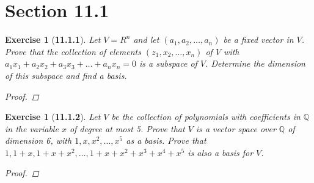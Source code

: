 \documentclass[12pt]{amsart}
\newtheorem{exercise}[theorem]{Exercise}
\theoremstyle{remark}
\newcommand{\QQ}{{\mathbb Q}}
\theoremstyle{mycomment}
\begin{document}
\section*{Section 11.1}

\begin{exercise}[\textbf{11.1.1}] Let $V = R^n$ and let $(a_1, a_2, \dots, a_n)$ be a fixed vector in $V$. Prove that the collection of elements
  $(z_1, x_2, \dots, x_n)$ of $V$ with $a_1x_1 + a_2x_2 + a_3x_3 + \dots + a_nx_n = 0$ is a subspace of $V$. Determine the dimension of this subspace 
  and find a basis.  
  \begin{proof} 
    
  \end{proof}
\end{exercise}
\vspace{.5in}



\begin{exercise}[\textbf{11.1.2}] Let $V$ be the collection of polynomials with coefficients in $\QQ$ in the variable $x$ of degree
  at most 5. Prove that $V$ is a vector space over $\QQ$ of dimension 6, with $1,x,x^2, \dots, x^5$ as a basis. Prove that $1, 1 + x, 1 + x + x^2, \dots, 1 + x + x^2 + x^3 + x^4 + x^5$ is 
  also a basis for $V$.
  \begin{proof}
    
  \end{proof}
\end{exercise}
\vspace{.5in}
\end{document}
